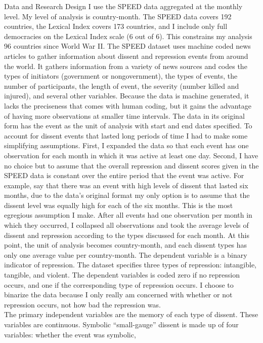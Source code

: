 \documentclass[ignorenonframetext,]{beamer}
\begin{document}
\begin{frame}[fragile]
Data and Research Design I use the SPEED data aggregated at the monthly
level. My level of analysis is country-month. The SPEED data covers 192
countries, the Lexical Index covers 173 countries, and I include only
full democracies on the Lexical Index scale (6 out of 6). This
constrains my analysis 96 countries since World War II. The SPEED
dataset uses machine coded news articles to gather information about
dissent and repression events from around the world. It gathers
information from a variety of news sources and codes the types of
initiators (government or nongovernment), the types of events, the
number of participants, the length of event, the severity (number killed
and injured), and several other variables. Because the data is machine
generated, it lacks the preciseness that comes with human coding, but it
gains the advantage of having more observations at smaller time
intervals. The data in its original form has the event as the unit of
analysis with start and end dates specified. To account for dissent
events that lasted long periods of time I had to make some simplifying
assumptions. First, I expanded the data so that each event has one
observation for each month in which it was active at least one day.
Second, I have no choice but to assume that the overall repression and
dissent scores given in the SPEED data is constant over the entire
period that the event was active. For example, say that there was an
event with high levels of dissent that lasted six months, due to the
data's original format my only option is to assume that the dissent
level was equally high for each of the six months. This is the most
egregious assumption I make. After all events had one observation per
month in which they occurred, I collapsed all observations and took the
average levels of dissent and repression according to the types
discussed for each month. At this point, the unit of analysis becomes
country-month, and each dissent types has only one average value per
country-month. The dependent variable is a binary indicator of
repression. The dataset specifies three types of repression: intangible,
tangible, and violent. The dependent variables is coded zero if no
repression occurs, and one if the corresponding type of repression
occurs. I choose to binarize the data because I only really am concerned
with whether or not repression occurs, not how bad the repression was.\\
The primary independent variables are the memory of each type of
dissent. These variables are continuous. Symbolic ``small-gauge''
dissent is made up of four variables: whether the event was symbolic,

\end{frame}
\end{document}
